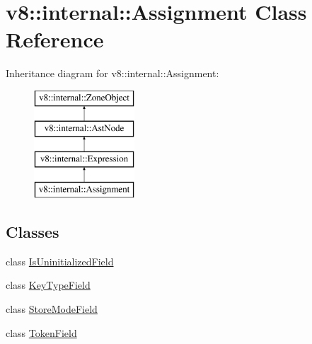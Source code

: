 \hypertarget{classv8_1_1internal_1_1_assignment}{}\section{v8\+:\+:internal\+:\+:Assignment Class Reference}
\label{classv8_1_1internal_1_1_assignment}
Inheritance diagram for v8\+:\+:internal\+:\+:Assignment\+:\begin{figure}[H]
\begin{center}
\leavevmode
\includegraphics[height=4.000000cm]{classv8_1_1internal_1_1_assignment}
\end{center}
\end{figure}
\subsection*{Classes}
\begin{DoxyCompactItemize}
\item 
class \hyperlink{classv8_1_1internal_1_1_assignment_1_1_is_uninitialized_field}{Is\+Uninitialized\+Field}
\item 
class \hyperlink{classv8_1_1internal_1_1_assignment_1_1_key_type_field}{Key\+Type\+Field}
\item 
class \hyperlink{classv8_1_1internal_1_1_assignment_1_1_store_mode_field}{Store\+Mode\+Field}
\item 
class \hyperlink{classv8_1_1internal_1_1_assignment_1_1_token_field}{Token\+Field}
\end{DoxyCompactItemize}
